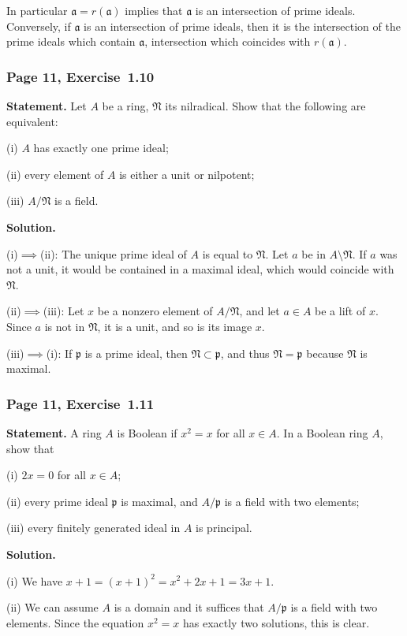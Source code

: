 \documentclass[12pt,letterpaper]{article}%
\newcommand{\mf}{\mathfrak}
\newcommand{\aaa}{\mf a}
\newcommand{\ppp}{\mf p}
\newcommand{\NNN}{\mf N}\newcommand{\RRR}{\mf R}
\newcommand{\nn}{\noindent}
\begin{document}
In particular $\aaa=r(\aaa)$ implies that $\aaa$ is an intersection of prime ideals. Conversely, if $\aaa$ is an intersection of prime ideals, then it is the intersection of the prime ideals which contain $\aaa$, intersection which coincides with $r(\aaa)$.

\subsubsection{Page 11, Exercise~1.10}%

\textbf{Statement.} Let $A$ be a ring, $\NNN$ its nilradical. Show that the following are equivalent: 

\nn(i) $A$ has exactly one prime ideal;

\nn(ii) every element of $A$ is either a unit or nilpotent; 

\nn(iii) $A/\NNN$ is a field.

\nn\textbf{Solution.} 

\nn(i)$\implies$(ii): The unique prime ideal of $A$ is equal to $\NNN$. Let $a$ be in $A\setminus\NNN$. If $a$ was not a unit, it would be contained in a maximal ideal, which would coincide with $\NNN$. 

\nn(ii)$\implies$(iii): Let $x$ be a nonzero element of $A/\NNN$, and let $a\in A$ be a lift of $x$. Since $a$ is not in $\NNN$, it is a unit, and so is its image $x$. 

\nn(iii)$\implies$(i): If $\ppp$ is a prime ideal, then $\NNN\subset\ppp$, and thus $\NNN=\ppp$ because $\NNN$ is maximal.%

\subsubsection{Page 11, Exercise~1.11}\label{ex1.11}%

\textbf{Statement.} A ring $A$ is Boolean if $x^2=x$ for all $x\in A$. In a Boolean ring $A$, show that 

\nn(i) $2x=0$ for all $x\in A$;

\nn(ii) every prime ideal $\ppp$ is maximal, and $A/\ppp$ is a field with two elements; 

\nn(iii) every finitely generated ideal in $A$ is principal.

\nn\textbf{Solution.}

\nn(i) We have $x+1=(x+1)^2=x^2+2x+1=3x+1$.

\nn(ii) We can assume $A$ is a domain and it suffices that $A/\ppp$ is a field with two elements. Since the equation $x^2=x$ has exactly two solutions, this is clear.
\end{document}
